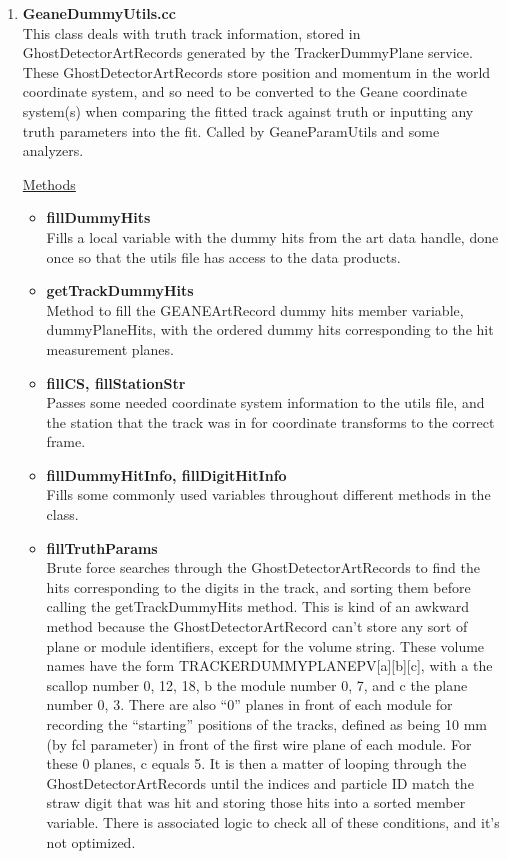 \begin{enumerate}
\begin{itemize}
        \end{itemize}

      \item{\bf{GeaneDummyUtils.cc}} \\
      This class deals with truth track information, stored in GhostDetectorArtRecords generated by the TrackerDummyPlane service. These GhostDetectorArtRecords store position and momentum in the world coordinate system, and so need to be converted to the Geane coordinate system(s) when comparing the fitted track against truth or inputting any truth parameters into the fit. Called by GeaneParamUtils and some analyzers.

      \underline{Methods}

        \begin{itemize}

          \item{\bf{fillDummyHits}} \\
          Fills a local variable with the dummy hits from the art data handle, done once so that the utils file has access to the data products.

          \item{\bf{getTrackDummyHits}} \\
          Method to fill the GEANEArtRecord dummy hits member variable, dummyPlaneHits, with the ordered dummy hits corresponding to the hit measurement planes.

          \item{\bf{fillCS, fillStationStr}} \\
          Passes some needed coordinate system information to the utils file, and the station that the track was in for coordinate transforms to the correct frame.

          \item{\bf{fillDummyHitInfo, fillDigitHitInfo}} \\
          Fills some commonly used variables throughout different methods in the class.

          \item{\bf{fillTruthParams}} \\
          Brute force searches through the GhostDetectorArtRecords to find the hits corresponding to the digits in the track, and sorting them before calling the getTrackDummyHits method. This is kind of an awkward method because the GhostDetectorArtRecord can't store any sort of plane or module identifiers, except for the volume string. These volume names have the form TRACKERDUMMYPLANEPV[a][b][c], with a the scallop number {0, 12, 18}, b the module number {0, 7}, and c the plane number {0, 3}. There are also ``0'' planes in front of each module for recording the ``starting'' positions of the tracks, defined as being 10 mm (by fcl parameter) in front of the first wire plane of each module. For these 0 planes, c equals 5. It is then a matter of looping through the GhostDetectorArtRecords until the indices and particle ID match the straw digit that was hit and storing those hits into a sorted member variable. There is associated logic to check all of these conditions, and it's not optimized.


\end{itemize}
\end{enumerate}
